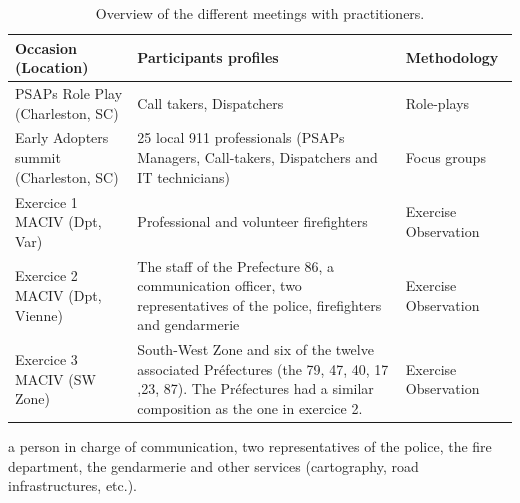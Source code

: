 \begin{table}[hbp]
    \centering
    \caption{Overview of the different meetings with practitioners.}
    \begin{tabular}{m{} m{} m{}}
        Occasion (Location)                    & Participants profiles                                                                                                                                          & Methodology          \\ [0.5ex]
        \toprule
        PSAPs Role Play (Charleston, SC)       & Call takers, Dispatchers                                                                                                                                       & Role-plays           \\
        Early Adopters summit (Charleston, SC) & 25 local 911 professionals (PSAPs Managers, Call-takers, Dispatchers and IT technicians)                                                                       & Focus groups         \\
        Exercice 1 MACIV (Dpt, Var)            & Professional and volunteer firefighters                                                                                                                        & Exercise Observation \\
        Exercice 2 MACIV (Dpt, Vienne)         & The staff of the Prefecture 86, a communication officer, two representatives of the police, firefighters and gendarmerie                                       & Exercise Observation \\
        Exercice 3 MACIV (SW Zone)             & South-West Zone and six of the twelve associated Préfectures (the 79, 47, 40, 17 ,23, 87). The Préfectures had a similar composition as the one in exercice 2. & Exercise Observation \\
        \bottomrule
    \end{tabular}
    \label{table:terrain-summary}
\end{table}
a person in charge of communication, two representatives of the police, the fire department, the gendarmerie and other services (cartography, road infrastructures, etc.).

